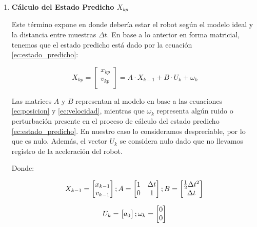 \begin{enumerate}
\item \textbf{Cálculo del Estado Predicho $X_{kp}$} \mbox{} \vspace{4pt}

Este término expone en donde debería estar el robot según el modelo ideal y la distancia entre muestras $\Delta t$. En base a lo anterior en forma matricial, tenemos que el estado predicho está dado por la ecuación \ref{ec:estado_predicho}:

\begin{equation}
    X_{kp} =
    \begin{bmatrix}
        x_{kp} \\ v_{kp} \\ 
    \end{bmatrix}
    =
    A \cdot X_{k-1} + B \cdot U_k + \omega_k
    \label{ec:estado_predicho}
\end{equation}

Las matrices $A$ y $B$ representan al modelo en base a las ecuaciones \ref{ec:posicion} y \ref{ec:velocidad}, mientras que $\omega_k$ representa algún ruido o perturbación presente en el proceso de cálculo del estado predicho \ref{ec:estado_predicho}. En nuestro caso lo consideramos despreciable, por lo que es nulo. Además, el vector $U_k$ se considera nulo dado que no llevamos registro de la aceleración del robot.

Donde:

\begin{equation}
    X_{k-1} = \begin{bmatrix} x_{k-1} \\ v_{k-1} \\ \end{bmatrix}
;
A = \begin{bmatrix}
    1 & \Delta t  \\
    0 & 1         \\
    \end{bmatrix} \\
;
B = \begin{bmatrix}
    \frac{1}{2} \Delta t^2 \\
    \Delta t               \\
    \end{bmatrix}          \\
\end{equation}

\begin{equation}
    U_k = \begin{bmatrix} a_0 \\ \end{bmatrix} \\
    ;
    \omega_k = \begin{bmatrix} 0 \\ 0 \\ \end{bmatrix}
\end{equation}


\end{enumerate}
